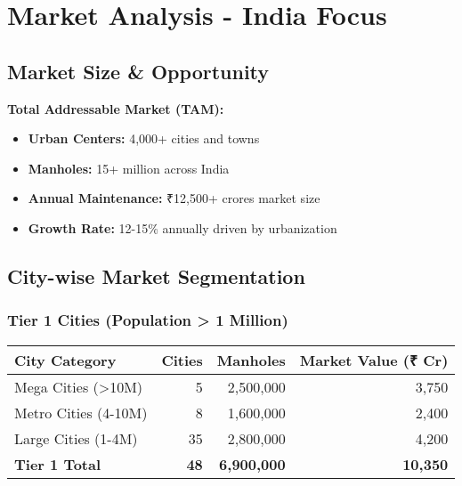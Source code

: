 \documentclass[11pt,a4paper]{article}
\begin{document}
\section{Market Analysis - India Focus}

\subsection{Market Size \& Opportunity}

\begin{market}
\textbf{Total Addressable Market (TAM):}
\begin{itemize}
    \item \textbf{Urban Centers:} 4,000+ cities and towns
    \item \textbf{Manholes:} 15+ million across India
    \item \textbf{Annual Maintenance:} ₹12,500+ crores market size
    \item \textbf{Growth Rate:} 12-15\% annually driven by urbanization
\end{itemize}
\end{market}

\subsection{City-wise Market Segmentation}

\subsubsection{Tier 1 Cities (Population > 1 Million)}
\begin{center}
\begin{tabular}{lrrr}
\toprule
\textbf{City Category} & \textbf{Cities} & \textbf{Manholes} & \textbf{Market Value (₹ Cr)} \\
\midrule
Mega Cities (>10M) & 5 & 2,500,000 & 3,750 \\
Metro Cities (4-10M) & 8 & 1,600,000 & 2,400 \\
Large Cities (1-4M) & 35 & 2,800,000 & 4,200 \\
\midrule
\textbf{Tier 1 Total} & \textbf{48} & \textbf{6,900,000} & \textbf{10,350} \\
\bottomrule
\end{tabular}
\end{center}
\end{document}
